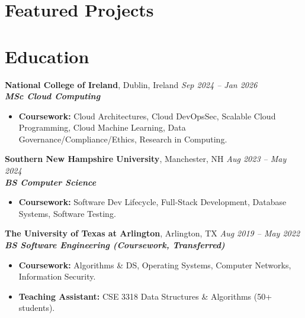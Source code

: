 \documentclass[10pt,a4paper]{article}
\begin{document}
\clearpage
\section*{Featured Projects}
\clearpage

\section*{Education}
\textbf{National College of Ireland}, Dublin, Ireland \hfill \textit{Sep 2024 -- Jan 2026}\\[-0.15em]
\textbf{\textit{MSc Cloud Computing}}\\[-0.25em]
\begin{itemize}
  \item \textbf{Coursework:} Cloud Architectures, Cloud DevOpsSec, Scalable Cloud Programming, Cloud Machine Learning, Data Governance/Compliance/Ethics, Research in Computing.
\end{itemize}
\vspace{0.20em}
\textbf{Southern New Hampshire University}, Manchester, NH \hfill \textit{Aug 2023 -- May 2024}\\[-0.15em]
\textbf{\textit{BS Computer Science}}\\[-0.25em]
\begin{itemize}
  \item \textbf{Coursework:} Software Dev Lifecycle, Full-Stack Development, Database Systems, Software Testing.
\end{itemize}
\vspace{0.20em}
\textbf{The University of Texas at Arlington}, Arlington, TX \hfill \textit{Aug 2019 -- May 2022}\\[-0.15em]
\textbf{\textit{BS Software Engineering (Coursework, Transferred)}}\\[-0.25em]
\begin{itemize}
  \item \textbf{Coursework:} Algorithms \& DS, Operating Systems, Computer Networks, Information Security.
  \item \textbf{Teaching Assistant:} CSE 3318 Data Structures \& Algorithms (50+ students).
\end{itemize}
\end{document}
